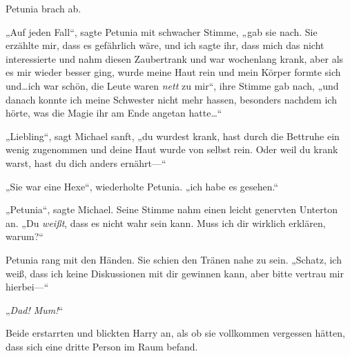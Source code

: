 Petunia brach ab.

„Auf jeden Fall“, sagte Petunia mit schwacher Stimme, „gab sie nach. Sie erzählte mir, dass es gefährlich wäre, und ich sagte ihr, dass mich das nicht interessierte und nahm diesen Zaubertrank und war wochenlang krank, aber als es mir wieder besser ging, wurde meine Haut rein und mein Körper formte sich und…ich war schön, die Leute waren \emph{nett} zu mir“, ihre Stimme gab nach, „und danach konnte ich meine Schwester nicht mehr hassen, besonders nachdem ich hörte, was die Magie ihr am Ende angetan hatte…“

„Liebling“, sagt Michael sanft, „du wurdest krank, hast durch die Bettruhe ein wenig zugenommen und deine Haut wurde von selbst rein. Oder weil du krank warst, hast du dich anders ernährt—“

„Sie war eine Hexe“, wiederholte Petunia. „ich habe es gesehen.“

„Petunia“, sagte Michael. Seine Stimme nahm einen leicht genervten Unterton an. „Du \emph{weißt}, dass es nicht wahr sein kann. Muss ich dir wirklich erklären, warum?“

Petunia rang mit den Händen. Sie schien den Tränen nahe zu sein. „Schatz, ich weiß, dass ich keine Diskussionen mit dir gewinnen kann, aber bitte vertrau mir hierbei—“

„\emph{Dad! Mum!}“

Beide erstarrten und blickten Harry an, als ob sie vollkommen vergessen hätten, dass sich eine dritte Person im Raum befand.

